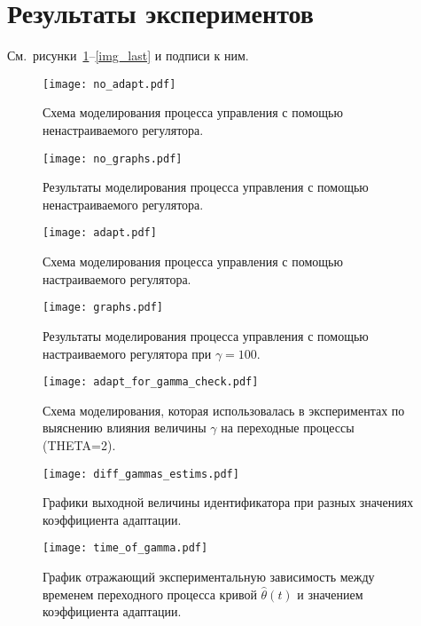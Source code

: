 \section{Результаты экспериментов}
См.~рисунки~\ref{img_first}--\ref{img_last} и подписи к ним.

\begin{figure}[h!]
    \centering
    \texttt{[image: no\_adapt.pdf]}
    \caption{Схема моделирования процесса управления с помощью ненастраиваемого регулятора.}
    \label{img_first}
\end{figure}

\begin{figure}[h!]
    \centering
    \texttt{[image: no\_graphs.pdf]}
    \caption{Результаты моделирования процесса управления с помощью ненастраиваемого регулятора.}
    \label{img_no_adapt_graphs}
\end{figure}

\begin{figure}[h!]
    \centering
    \texttt{[image: adapt.pdf]}
    \caption{Схема моделирования процесса управления с помощью настраиваемого регулятора.}
\end{figure}

\begin{figure}[h!]
    \centering
    \texttt{[image: graphs.pdf]}
    \caption{Результаты моделирования процесса управления с помощью настраиваемого регулятора при $\gamma=100$.}
    \label{img_adapt_graphs}
\end{figure}

\begin{figure}[h!]
    \centering
    \texttt{[image: adapt\_for\_gamma\_check.pdf]}
    \caption{Схема моделирования, которая использовалась в экспериментах по выяснению влияния величины $\gamma$ на переходные процессы (\textsf{THETA=2}).}
\end{figure}

\begin{figure}[h!]
    \centering
    \texttt{[image: diff\_gammas\_estims.pdf]}
    \caption{Графики выходной величины идентификатора при разных значениях коэффициента адаптации.}
    \label{img_diff_gammas_estims}
\end{figure}

\begin{figure}[h!]
    \centering
    \texttt{[image: time\_of\_gamma.pdf]}
    \caption{График отражающий экспериментальную зависимость между временем переходного процесса кривой $\hat\theta(t)$ и значением коэффициента адаптации.}
    \label{img_time_of_gamma}
\end{figure}

